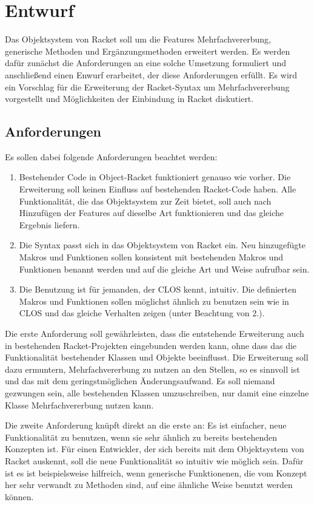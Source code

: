 \chapter{Entwurf} 
Das Objektsystem von Racket soll um die Features Mehrfachvererbung, generische Methoden und Ergänzungsmethoden erweitert werden. Es werden dafür zunächst die Anforderungen an eine solche Umsetzung formuliert und anschließend einen Enwurf erarbeitet, der diese Anforderungen erfüllt. Es wird ein Vorschlag für die Erweiterung der Racket-Syntax um Mehrfachvererbung vorgestellt und Möglichkeiten der Einbindung in Racket diskutiert.

\section{Anforderungen}
Es sollen dabei folgende Anforderungen beachtet werden:
\begin{enumerate}
 \item Bestehender Code in Object-Racket funktioniert genauso wie vorher. Die Erweiterung soll keinen Einfluss auf bestehenden Racket-Code haben. Alle Funktionalität, die das Objektsystem zur Zeit bietet, soll auch nach Hinzufügen der Features auf dieselbe Art funktionieren und das gleiche Ergebnis liefern.
 \item Die Syntax passt sich in das Objektsystem von Racket ein. Neu hinzugefügte Makros und Funktionen sollen konsistent mit bestehenden Makros und Funktionen benannt werden und auf die gleiche Art und Weise aufrufbar sein. 
 \item Die Benutzung ist für jemanden, der CLOS kennt, intuitiv. Die definierten Makros und Funktionen sollen möglichst ähnlich zu benutzen sein wie in CLOS und das gleiche Verhalten zeigen (unter Beachtung von 2.).
\end{enumerate}

Die erste Anforderung soll gewährleisten, dass die entstehende Erweiterung auch in bestehenden Racket-Projekten eingebunden werden kann, ohne dass das die Funktionalität bestehender Klassen und Objekte beeinflusst. Die Erweiterung soll dazu ermuntern, Mehrfachvererbung zu nutzen an den Stellen, so es sinnvoll ist und das mit dem geringstmöglichen Änderungsaufwand. Es soll niemand gezwungen sein, alle bestehenden Klassen umzuschreiben, nur damit eine einzelne Klasse Mehrfachvererbung nutzen kann.

Die zweite Anforderung knüpft direkt an die erste an: Es ist einfacher, neue Funktionalität zu benutzen, wenn sie sehr ähnlich zu bereits bestehenden Konzepten ist. Für einen Entwickler, der sich bereits mit dem Objektsystem von Racket auskennt, soll die neue Funktionalität so intuitiv wie möglich sein. Dafür ist es ist beispielsweise hilfreich, wenn generische Funktionenen, die vom Konzept her sehr verwandt zu Methoden sind, auf eine ähnliche Weise benutzt werden können.

